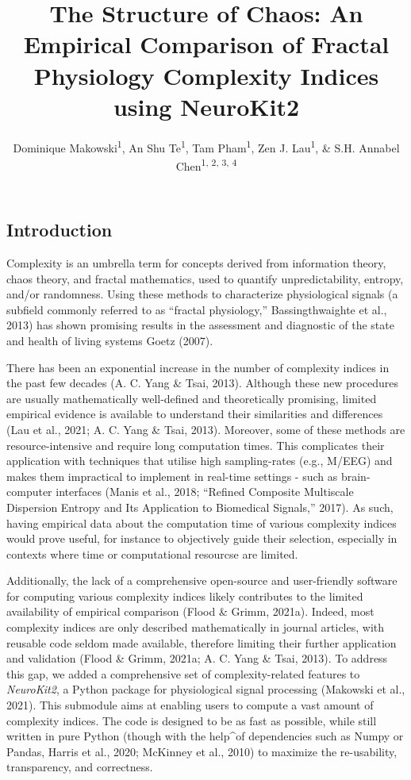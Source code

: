 \documentclass[
  man]{apa6}
\title{\textbf{The Structure of Chaos: An Empirical Comparison of Fractal Physiology Complexity Indices using NeuroKit2}}
\author{Dominique Makowski\textsuperscript{1}, An Shu Te\textsuperscript{1}, Tam Pham\textsuperscript{1}, Zen J. Lau\textsuperscript{1}, \& S.H. Annabel Chen\textsuperscript{1, 2, 3, 4}}
\date{}
\affiliation{\vspace{0.5cm}\textsuperscript{1} School of Social Sciences, Nanyang Technological University, Singapore\\\textsuperscript{2} LKC Medicine, Nanyang Technological University, Singapore\\\textsuperscript{3} National Institute of Education, Singapore\\\textsuperscript{4} Centre for Research and Development in Learning, Nanyang Technological University, Singapore}
\begin{document}
\maketitle

\hypertarget{introduction}{%
\subsection{Introduction}\label{introduction}}

Complexity is an umbrella term for concepts derived from information theory, chaos theory, and fractal mathematics, used to quantify unpredictability, entropy, and/or randomness. Using these methods to characterize physiological signals (a subfield commonly referred to as ``fractal physiology,'' Bassingthwaighte et al., 2013) has shown promising results in the assessment and diagnostic of the state and health of living systems Goetz (2007).

There has been an exponential increase in the number of complexity indices in the past few decades (A. C. Yang \& Tsai, 2013). Although these new procedures are usually mathematically well-defined and theoretically promising, limited empirical evidence is available to understand their similarities and differences (Lau et al., 2021; A. C. Yang \& Tsai, 2013). Moreover, some of these methods are resource-intensive and require long computation times. This complicates their application with techniques that utilise high sampling-rates (e.g., M/EEG) and makes them impractical to implement in real-time settings - such as brain-computer interfaces (Manis et al., 2018; {``Refined Composite Multiscale Dispersion Entropy and Its Application to Biomedical Signals,''} 2017). As such, having empirical data about the computation time of various complexity indices would prove useful, for instance to objectively guide their selection, especially in contexts where time or computational resourcse are limited.

Additionally, the lack of a comprehensive open-source and user-friendly software for computing various complexity indices likely contributes to the limited availability of empirical comparison (Flood \& Grimm, 2021a). Indeed, most complexity indices are only described mathematically in journal articles, with reusable code seldom made available, therefore limiting their further application and validation (Flood \& Grimm, 2021a; A. C. Yang \& Tsai, 2013). To address this gap, we added a comprehensive set of complexity-related features to \emph{NeuroKit2}, a Python package for physiological signal processing (Makowski et al., 2021). This submodule aims at enabling users to compute a vast amount of complexity indices. The code is designed to be as fast as possible, while still written in pure Python (though with the help\^{}of dependencies such as Numpy or Pandas, Harris et al., 2020; McKinney et al., 2010) to maximize the re-usability, transparency, and correctness.
\end{document}
